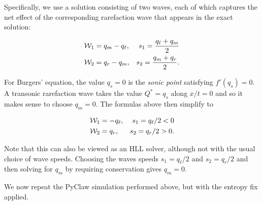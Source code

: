 \documentclass{SIAMbook2016}
\begin{document}
Specifically, we use a solution consisting of two waves, each of which
captures the net effect of the corresponding rarefaction wave that
appears in the exact solution:

\begin{align}
{\cal W}_1 & = q_m - q_\ell, & s_1 = \frac{q_\ell + q_m}{2} \\
{\cal W}_2 & = q_r - q_m, & s_2 = \frac{q_m + q_r}{2}.
\end{align}

For Burgers' equation, the value \(q_s=0\) is the \emph{sonic point}
satisfying \(f'(q_s)=0\). A transonic rarefaction wave takes the value
\(Q^*=q_s\) along \(x/t = 0\) and so it makes sense to choose
\(q_m = 0\). The formulas above then simplify to

\begin{align}
{\cal W}_1 & = - q_\ell, & s_1 = q_\ell / 2 < 0 \\
{\cal W}_2 & = q_r, & s_2 = q_r / 2 > 0.
\end{align}

Note that this can also be viewed as an HLL solver, although not with
the usual choice of wave speeds. Choosing the waves speeds
\(s_1=q_\ell/2\) and \(s_2=q_r/2\) and then solving for \(q_m\) by
requiring conservation gives \(q_m=0\).

We now repeat the PyClaw simulation performed above, but with the
entropy fix applied.
\end{document}
